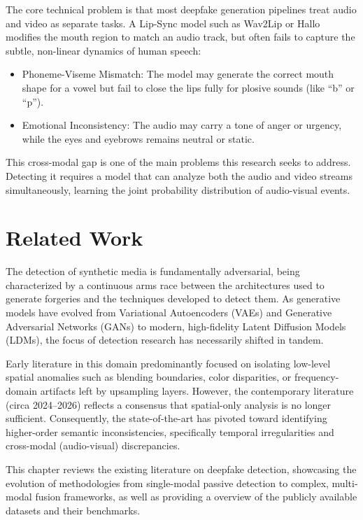 \documentclass[12pt,a4paper]{report}
\begin{document}
The core technical problem is that most deepfake generation pipelines treat audio and video as separate tasks. A Lip-Sync model such as Wav2Lip \cite{wav2lip} or Hallo \cite{xu2024hallo} modifies the mouth region to match an audio track, but often fails to capture the subtle, non-linear dynamics of human speech:
\begin{itemize}
    \item Phoneme-Viseme Mismatch: The model may generate the correct mouth shape for a vowel but fail to close the lips fully for plosive sounds (like ``b'' or ``p'').
    \item Emotional Inconsistency: The audio may carry a tone of anger or urgency, while the eyes and eyebrows remains neutral or static.
\end{itemize}
This cross-modal gap is one of the main problems this research seeks to address. Detecting it requires a model that can analyze both the audio and video streams simultaneously, learning the joint probability distribution of audio-visual events.


\chapter{Related Work}\pagestyle{fancy}
The detection of synthetic media is fundamentally adversarial, being characterized by a continuous arms race between the architectures used to generate forgeries and the  techniques developed to detect them. As generative models have evolved from  Variational Autoencoders (VAEs) and Generative Adversarial Networks (GANs) to modern, high-fidelity Latent Diffusion Models (LDMs), the focus of detection research has necessarily shifted in tandem.


Early literature in this domain predominantly focused on isolating low-level spatial anomalies such as blending boundaries, color disparities, or frequency-domain artifacts left by upsampling layers. However, the contemporary literature (circa 2024–2026) reflects a consensus that spatial-only analysis is no longer sufficient. Consequently, the state-of-the-art has pivoted toward identifying higher-order semantic inconsistencies, specifically temporal irregularities and cross-modal (audio-visual) discrepancies.

This chapter reviews the existing literature on deepfake detection, showcasing the evolution of methodologies from single-modal passive detection to complex, multi-modal fusion frameworks, as well as providing a overview of the publicly available datasets and their benchmarks.
\end{document}
